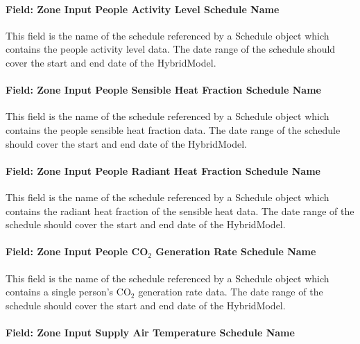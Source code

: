 \paragraph{Field: Zone Input People Activity Level Schedule Name}\label{field-zone-input-people-activity-schedule-name-hm}

This field is the name of the schedule referenced by a Schedule object which contains the people activity level data. The date range of the schedule should cover the start and end date of the HybridModel.

\paragraph{Field: Zone Input People Sensible Heat Fraction Schedule Name}\label{field-zone-input-people-sensible-heat-fraction-schedule-name-hm}

This field is the name of the schedule referenced by a Schedule object which contains the people sensible heat fraction data. The date range of the schedule should cover the start and end date of the HybridModel.

\paragraph{Field: Zone Input People Radiant Heat Fraction Schedule Name}\label{field-zone-input-people-radiant-heat-fraction-schedule-name-hm}

This field is the name of the schedule referenced by a Schedule object which contains the radiant heat fraction of the sensible heat data. The date range of the schedule should cover the start and end date of the HybridModel.

\paragraph{Field: Zone Input People CO$_2$ Generation Rate Schedule Name}\label{field-zone-input-people-co2-generation-rate-schedule-name-hm}

This field is the name of the schedule referenced by a Schedule object which contains a single person's CO$_2$ generation rate data. The date range of the schedule should cover the start and end date of the HybridModel.

\paragraph{Field: Zone Input Supply Air Temperature Schedule Name}\label{field-zone-input-supply-air-temperature-schedule-name-hm}

